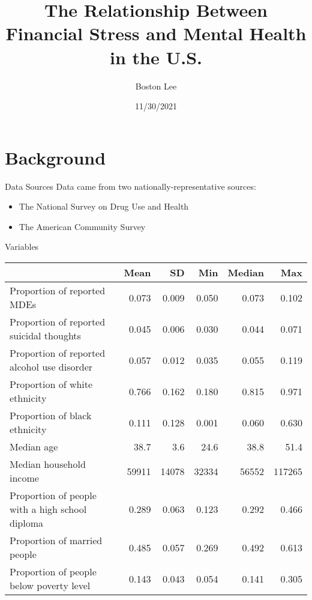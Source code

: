 \documentclass{beamer}
\title{The Relationship Between Financial Stress and Mental Health in the U.S.}
\author{Boston Lee}
\institute{Colorado State University, Honors Program}
\date{11/30/2021}
\begin{document}
\begin{frame}
  \titlepage
\end{frame}

\section{Background}

\begin{frame}{}
\end{frame}

\begin{frame}{Data Sources}
Data came from two nationally-representative sources:
\begin{itemize}
    \item The National Survey on Drug Use and Health 
                    \cite{acs_demographics_data}
                    \cite{acs_poverty_data}
                    \cite{acs_income_data}
                    \cite{acs_marital_data}
                    \cite{acs_education_data}\\
    \item The American Community Survey \cite{samhsa_data}\\
\end{itemize}
\end{frame}

\begin{frame}{Variables}
\begin{table}[t]
\tiny
\begin{center}
\begin{tabular}{l r r r r r}
    \toprule
    & Mean & SD & Min & Median & Max\\
    \midrule
    Proportion of reported MDEs & 0.073 & 0.009 & 0.050 & 0.073 & 0.102\\
    Proportion of reported suicidal thoughts & 0.045 & 0.006 & 0.030 & 0.044 & 0.071\\
    Proportion of reported alcohol use disorder & 0.057 & 0.012 & 0.035 & 0.055 & 0.119\\
    Proportion of white ethnicity & 0.766 & 0.162 & 0.180 & 0.815 & 0.971\\
    Proportion of black ethnicity & 0.111 & 0.128 & 0.001 & 0.060 & 0.630\\
    Median age & 38.7 & 3.6 & 24.6 & 38.8 & 51.4\\
    Median household income & 59911 & 14078 & 32334 & 56552 & 117265\\
    Proportion of people with a high school diploma & 0.289 & 0.063 & 0.123 & 0.292 & 0.466\\
    Proportion of married people & 0.485 & 0.057 & 0.269 & 0.492 & 0.613\\
    Proportion of people below poverty level & 0.143 & 0.043 & 0.054 & 0.141 & 0.305\\
    \bottomrule
\end{tabular}
\end{center}
\end{table}
\end{frame}
\end{document}
